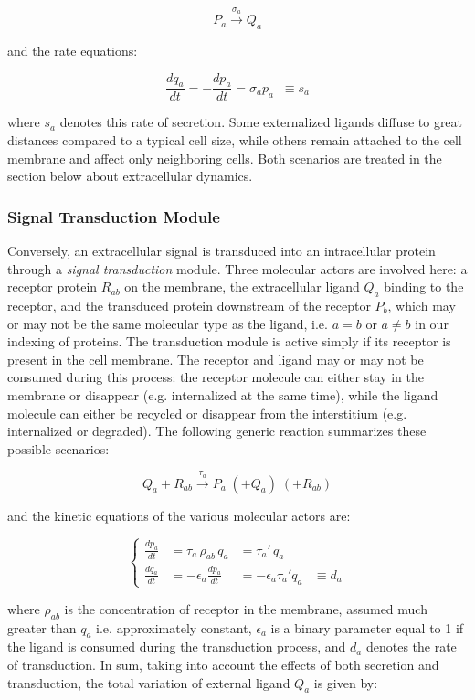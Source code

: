 $$P_a \overset{\sigma_a}{\rightarrow} Q_a$$

and the rate equations:

$$\frac{dq_a}{dt} = -\frac{dp_a}{dt} = \sigma_a p_a \;\;\equiv s_a$$

where $s_a$ denotes this rate of secretion. Some externalized ligands diffuse to great distances compared to a typical cell size, while others remain attached to the cell membrane and affect only neighboring cells. Both scenarios are treated in the section below about extracellular dynamics.


\subsubsection{Signal Transduction Module}


Conversely, an extracellular signal is transduced into an intracellular protein through a \textit{signal transduction} module. Three molecular actors are involved here: a receptor protein $R_{ab}$ on the membrane, the extracellular ligand $Q_a$ binding to the receptor, and the transduced protein downstream of the receptor $P_b$, which may or may not be the same molecular type as the ligand, i.e. $a=b$ or $a\neq b$ in our indexing of proteins. The transduction module is active simply if its receptor is present in the cell membrane. The receptor and ligand may or may not be consumed during this process: the receptor molecule can either stay in the membrane or disappear (e.g. internalized at the same time), while the ligand molecule can either be recycled or disappear from the interstitium (e.g. internalized or degraded). The following generic reaction summarizes these possible scenarios:

$$Q_a + R_{ab} \overset{\tau_a}{\rightarrow} P_a \;(+ Q_a) \;(+ R_{ab})$$

and the kinetic equations of the various molecular actors are:  

$$\begin{cases}       \frac{dp_a}{dt} & = \tau_a\, \rho_{ab}\, q_a & = \tau_a'\, q_a \\[.5em]       \frac{dq_a}{dt} & = -\epsilon_a \frac{dp_a}{dt} & = -\epsilon_a \tau_a' q_a & \equiv d_a     \end{cases}$$

where $\rho_{ab}$ is the concentration of receptor in the membrane, assumed much greater than $q_a$ i.e. approximately constant, $\epsilon_a$ is a binary parameter equal to 1 if the ligand is consumed during the transduction process, and $d_a$ denotes the rate of transduction. In sum, taking into account the effects of both secretion and transduction, the total variation of external ligand $Q_a$ is given by:

